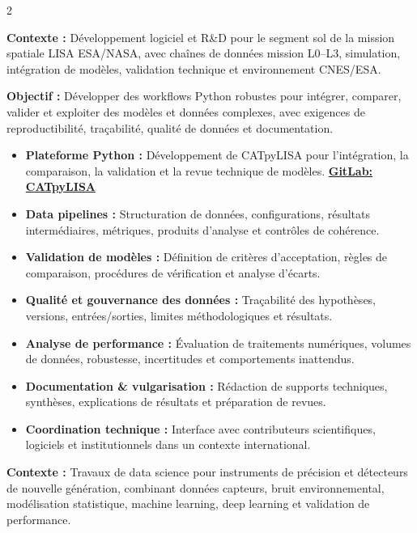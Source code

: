 \documentclass[8pt,a4paper,ragged2e,withhyper]{altacv}
\begin{document}
\begin{paracol}{2}
\divider


\textbf{Contexte :} Développement logiciel et R\&D pour le segment sol de la mission spatiale LISA ESA/NASA, avec chaînes de données mission L0--L3, simulation, intégration de modèles, validation technique et environnement CNES/ESA.

\textbf{Objectif :} Développer des workflows Python robustes pour intégrer, comparer, valider et exploiter des modèles et données complexes, avec exigences de reproductibilité, traçabilité, qualité de données et documentation.

\begin{itemize}
  \item \textbf{Plateforme Python :} Développement de CATpyLISA pour l’intégration, la comparaison, la validation et la revue technique de modèles.
  \textcolor{DarkPastelRed}{\href{https://gitlab.oca.eu/gboileau/lisa_l3_tools}{\bf GitLab: CATpyLISA}}
  \item \textbf{Data pipelines :} Structuration de données, configurations, résultats intermédiaires, métriques, produits d’analyse et contrôles de cohérence.
  \item \textbf{Validation de modèles :} Définition de critères d’acceptation, règles de comparaison, procédures de vérification et analyse d’écarts.
  \item \textbf{Qualité et gouvernance des données :} Traçabilité des hypothèses, versions, entrées/sorties, limites méthodologiques et résultats.
  \item \textbf{Analyse de performance :} Évaluation de traitements numériques, volumes de données, robustesse, incertitudes et comportements inattendus.
  \item \textbf{Documentation \& vulgarisation :} Rédaction de supports techniques, synthèses, explications de résultats et préparation de revues.
  \item \textbf{Coordination technique :} Interface avec contributeurs scientifiques, logiciels et institutionnels dans un contexte international.
\end{itemize}

\divider


\textbf{Contexte :} Travaux de data science pour instruments de précision et détecteurs de nouvelle génération, combinant données capteurs, bruit environnemental, modélisation statistique, machine learning, deep learning et validation de performance.


\end{paracol}
\end{document}
